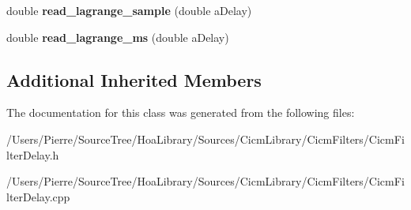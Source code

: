 \begin{DoxyCompactItemize}
\item 
\hypertarget{class_cicm_filter_delay_a8a412efede986adf65259a232d43b591}{double {\bfseries read\-\_\-lagrange\-\_\-sample} (double a\-Delay)}\label{class_cicm_filter_delay_a8a412efede986adf65259a232d43b591}

\item 
\hypertarget{class_cicm_filter_delay_a5fb08f3cdbc8ee57e27066f727d7db9e}{double {\bfseries read\-\_\-lagrange\-\_\-ms} (double a\-Delay)}\label{class_cicm_filter_delay_a5fb08f3cdbc8ee57e27066f727d7db9e}

\end{DoxyCompactItemize}
\subsection*{Additional Inherited Members}


The documentation for this class was generated from the following files\-:\begin{DoxyCompactItemize}
\item 
/\-Users/\-Pierre/\-Source\-Tree/\-Hoa\-Library/\-Sources/\-Cicm\-Library/\-Cicm\-Filters/Cicm\-Filter\-Delay.\-h\item 
/\-Users/\-Pierre/\-Source\-Tree/\-Hoa\-Library/\-Sources/\-Cicm\-Library/\-Cicm\-Filters/Cicm\-Filter\-Delay.\-cpp\end{DoxyCompactItemize}
